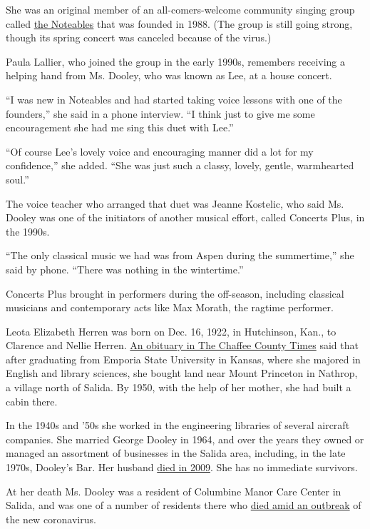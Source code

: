 She was an original member of an all-comers-welcome community singing
group called \href{http://www.salidasings.org/noteables.html}{the
Noteables} that was founded in 1988. (The group is still going strong,
though its spring concert was canceled because of the virus.)

Paula Lallier, who joined the group in the early 1990s, remembers
receiving a helping hand from Ms. Dooley, who was known as Lee, at a
house concert.

``I was new in Noteables and had started taking voice lessons with one
of the founders,'' she said in a phone interview. ``I think just to give
me some encouragement she had me sing this duet with Lee.''

``Of course Lee's lovely voice and encouraging manner did a lot for my
confidence,'' she added. ``She was just such a classy, lovely, gentle,
warmhearted soul.''

The voice teacher who arranged that duet was Jeanne Kostelic, who said
Ms. Dooley was one of the initiators of another musical effort, called
Concerts Plus, in the 1990s.

``The only classical music we had was from Aspen during the
summertime,'' she said by phone. ``There was nothing in the
wintertime.''

Concerts Plus brought in performers during the off-season, including
classical musicians and contemporary acts like Max Morath, the ragtime
performer.

Leota Elizabeth Herren was born on Dec. 16, 1922, in Hutchinson, Kan.,
to Clarence and Nellie Herren.
\href{http://www.chaffeecountytimes.com/obituaries/leota-dooley/article_dcd20214-9c75-11ea-8bd5-b337d7f2b33f.html}{An
obituary in The Chaffee County Times} said that after graduating from
Emporia State University in Kansas, where she majored in English and
library sciences, she bought land near Mount Princeton in Nathrop, a
village north of Salida. By 1950, with the help of her mother, she had
built a cabin there.

In the 1940s and '50s she worked in the engineering libraries of several
aircraft companies. She married George Dooley in 1964, and over the
years they owned or managed an assortment of businesses in the Salida
area, including, in the late 1970s, Dooley's Bar. Her husband
\href{http://www.chaffeecountytimes.com/obituaries/george-d-dooley/article_ad3ee599-81d9-56f0-b918-78ea1abbea04.html}{died
in 2009}. She has no immediate survivors.

At her death Ms. Dooley was a resident of Columbine Manor Care Center in
Salida, and was one of a number of residents there who
\href{https://arkvalleyvoice.com/four_additional_covid_19_cases_staff_at-columbine_manor/}{died
amid an outbreak} of the new coronavirus.

